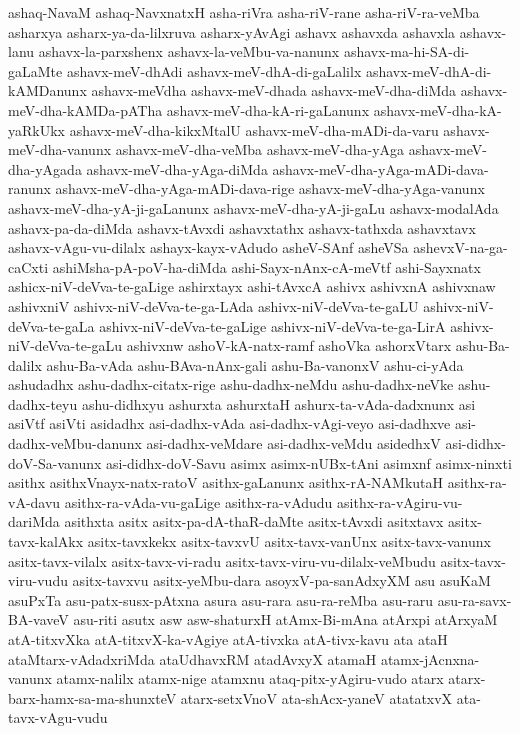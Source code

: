 {ashaq-NavaM
ashaq-NavxnatxH
asha-riVra
asha-riV-rane
asha-riV-ra-veMba
asharxya
asharx-ya-da-lilxruva
asharx-yAvAgi
ashavx
ashavxda
ashavxla
ashavx-lanu
ashavx-la-parxshenx
ashavx-la-veMbu-va-nanunx
ashavx-ma-hi-SA-di-gaLaMte
ashavx-meV-dhAdi
ashavx-meV-dhA-di-gaLalilx
ashavx-meV-dhA-di-kAMDanunx
ashavx-meVdha
ashavx-meV-dhada
ashavx-meV-dha-diMda
ashavx-meV-dha-kAMDa-pATha
ashavx-meV-dha-kA-ri-gaLanunx
ashavx-meV-dha-kA-yaRkUkx
ashavx-meV-dha-kikxMtalU
ashavx-meV-dha-mADi-da-varu
ashavx-meV-dha-vanunx
ashavx-meV-dha-veMba
ashavx-meV-dha-yAga
ashavx-meV-dha-yAgada
ashavx-meV-dha-yAga-diMda
ashavx-meV-dha-yAga-mADi-dava-ranunx
ashavx-meV-dha-yAga-mADi-dava-rige
ashavx-meV-dha-yAga-vanunx
ashavx-meV-dha-yA-ji-gaLanunx
ashavx-meV-dha-yA-ji-gaLu
ashavx-modalAda
ashavx-pa-da-diMda
ashavx-tAvxdi
ashavxtathx
ashavx-tathxda
ashavxtavx
ashavx-vAgu-vu-dilalx
ashayx-kayx-vAdudo
asheV-SAnf
asheVSa
ashevxV-na-ga-caCxti
ashiMsha-pA-poV-ha-diMda
ashi-Sayx-nAnx-cA-meVtf
ashi-Sayxnatx
ashicx-niV-deVva-te-gaLige
ashirxtayx
ashi-tAvxcA
ashivx
ashivxnA
ashivxnaw
ashivxniV
ashivx-niV-deVva-te-ga-LAda
ashivx-niV-deVva-te-gaLU
ashivx-niV-deVva-te-gaLa
ashivx-niV-deVva-te-gaLige
ashivx-niV-deVva-te-ga-LirA
ashivx-niV-deVva-te-gaLu
ashivxnw
ashoV-kA-natx-ramf
ashoVka
ashorxVtarx
ashu-Ba-dalilx
ashu-Ba-vAda
ashu-BAva-nAnx-gali
ashu-Ba-vanonxV
ashu-ci-yAda
ashudadhx
ashu-dadhx-citatx-rige
ashu-dadhx-neMdu
ashu-dadhx-neVke
ashu-dadhx-teyu
ashu-didhxyu
ashurxta
ashurxtaH
ashurx-ta-vAda-dadxnunx
asi
asiVtf
asiVti
asidadhx
asi-dadhx-vAda
asi-dadhx-vAgi-veyo
asi-dadhxve
asi-dadhx-veMbu-danunx
asi-dadhx-veMdare
asi-dadhx-veMdu
asidedhxV
asi-didhx-doV-Sa-vanunx
asi-didhx-doV-Savu
asimx
asimx-nUBx-tAni
asimxnf
asimx-ninxti
asithx
asithxVnayx-natx-ratoV
asithx-gaLanunx
asithx-rA-NAMkutaH
asithx-ra-vA-davu
asithx-ra-vAda-vu-gaLige
asithx-ra-vAdudu
asithx-ra-vAgiru-vu-dariMda
asithxta
asitx
asitx-pa-dA-thaR-daMte
asitx-tAvxdi
asitxtavx
asitx-tavx-kalAkx
asitx-tavxkekx
asitx-tavxvU
asitx-tavx-vanUnx
asitx-tavx-vanunx
asitx-tavx-vilalx
asitx-tavx-vi-radu
asitx-tavx-viru-vu-dilalx-veMbudu
asitx-tavx-viru-vudu
asitx-tavxvu
asitx-yeMbu-dara
asoyxV-pa-sanAdxyXM
asu
asuKaM
asuPxTa
asu-patx-susx-pAtxna
asura
asu-rara
asu-ra-reMba
asu-raru
asu-ra-savx-BA-vaveV
asu-riti
asutx
asw
asw-shaturxH
atAmx-Bi-mAna
atArxpi
atArxyaM
atA-titxvXka
atA-titxvX-ka-vAgiye
atA-tivxka
atA-tivx-kavu
ata
ataH
ataMtarx-vAdadxriMda
ataUdhavxRM
atadAvxyX
atamaH
atamx-jAcnxna-vanunx
atamx-nalilx
atamx-nige
atamxnu
ataq-pitx-yAgiru-vudo
atarx
atarx-barx-hamx-sa-ma-shunxteV
atarx-setxVnoV
ata-shAcx-yaneV
atatatxvX
ata-tavx-vAgu-vudu
}

